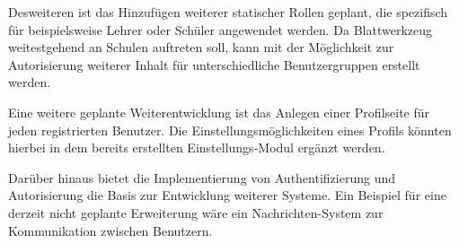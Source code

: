 Desweiteren ist das Hinzufügen weiterer statischer Rollen geplant, die spezifisch für beispielsweise Lehrer oder Schüler angewendet werden. Da Blattwerkzeug weitestgehend an Schulen auftreten soll, kann mit der Möglichkeit zur Autorisierung weiterer Inhalt für unterschiedliche Benutzergruppen erstellt werden.

Eine weitere geplante Weiterentwicklung ist das Anlegen einer Profilseite für jeden registrierten Benutzer. Die Einstellungsmöglichkeiten eines Profils könnten hierbei in dem bereits erstellten Einstellungs-Modul ergänzt werden. 

Darüber hinaus bietet die Implementierung von Authentifizierung und Autorisierung die Basis zur Entwicklung weiterer Systeme. Ein Beispiel für eine derzeit nicht geplante Erweiterung wäre ein Nachrichten-System zur Kommunikation zwischen Benutzern.



